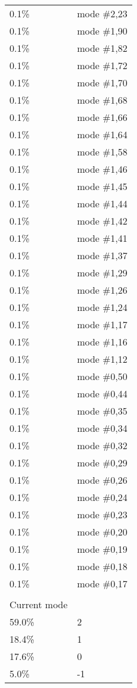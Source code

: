 \begin{longtable}{l l}
0.1\% & mode \#2,23\\
0.1\% & mode \#1,90\\
0.1\% & mode \#1,82\\
0.1\% & mode \#1,72\\
0.1\% & mode \#1,70\\
0.1\% & mode \#1,68\\
0.1\% & mode \#1,66\\
0.1\% & mode \#1,64\\
0.1\% & mode \#1,58\\
0.1\% & mode \#1,46\\
0.1\% & mode \#1,45\\
0.1\% & mode \#1,44\\
0.1\% & mode \#1,42\\
0.1\% & mode \#1,41\\
0.1\% & mode \#1,37\\
0.1\% & mode \#1,29\\
0.1\% & mode \#1,26\\
0.1\% & mode \#1,24\\
0.1\% & mode \#1,17\\
0.1\% & mode \#1,16\\
0.1\% & mode \#1,12\\
0.1\% & mode \#0,50\\
0.1\% & mode \#0,44\\
0.1\% & mode \#0,35\\
0.1\% & mode \#0,34\\
0.1\% & mode \#0,32\\
0.1\% & mode \#0,29\\
0.1\% & mode \#0,26\\
0.1\% & mode \#0,24\\
0.1\% & mode \#0,23\\
0.1\% & mode \#0,20\\
0.1\% & mode \#0,19\\
0.1\% & mode \#0,18\\
0.1\% & mode \#0,17\\\\

Current mode\\
59.0\% & 2\\
18.4\% & 1\\
17.6\% & 0\\
5.0\% & -1\\
\end{longtable}
